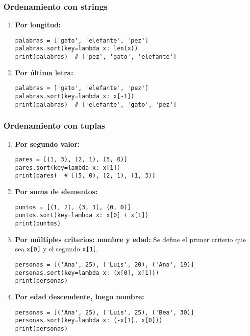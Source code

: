 \documentclass[12pt,letterpaper]{article}
\begin{document}
\subsubsection{Ordenamiento con strings}

\begin{enumerate}

  \item \textbf{Por longitud:}

\begin{verbatim}
palabras = ['gato', 'elefante', 'pez']
palabras.sort(key=lambda x: len(x))
print(palabras)  # ['pez', 'gato', 'elefante']
\end{verbatim}

  \item \textbf{Por última letra:}

\begin{verbatim}
palabras = ['gato', 'elefante', 'pez']
palabras.sort(key=lambda x: x[-1])
print(palabras)  # ['elefante', 'gato', 'pez']
\end{verbatim}

\end{enumerate}

\subsubsection{Ordenamiento con tuplas}

\begin{enumerate}

  \item \textbf{Por segundo valor:}

\begin{verbatim}
pares = [(1, 3), (2, 1), (5, 0)]
pares.sort(key=lambda x: x[1])
print(pares)  # [(5, 0), (2, 1), (1, 3)]
\end{verbatim}

  \item \textbf{Por suma de elementos:}

\begin{verbatim}
puntos = [(1, 2), (3, 1), (0, 0)]
puntos.sort(key=lambda x: x[0] + x[1])
print(puntos)
\end{verbatim}

  \item \textbf{Por múltiples criterios: nombre y edad:} Se define el primer criterio que sea \texttt{x[0]} y el segundo \texttt{x[1]}.

\begin{verbatim}
personas = [('Ana', 25), ('Luis', 20), ('Ana', 19)]
personas.sort(key=lambda x: (x[0], x[1]))
print(personas)
\end{verbatim}

  \item \textbf{Por edad descendente, luego nombre:}

\begin{verbatim}
personas = [('Ana', 25), ('Luis', 25), ('Bea', 30)]
personas.sort(key=lambda x: (-x[1], x[0]))
print(personas)
\end{verbatim}

\end{enumerate}
\end{document}
